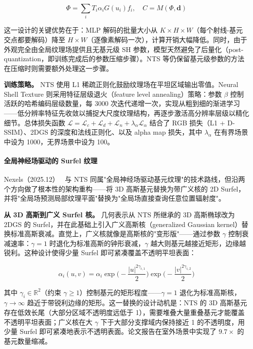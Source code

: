 \begin{equation}
\Phi = \sum_i T_i \alpha_i G(u_i) f_i, \quad C = M(\Phi, \mathbf{d})
\end{equation}

这一设计的关键优势在于：MLP 解码的批量大小从 $K \times H \times W$（每个射线-基元交点都要解码）降至 $H \times W$（逐像素解码一次），计算开销大幅降低。同时，由于外观完全由全局纹理场提供且无基元级 SH 参数，模型天然避免了后量化（post-quantization，即训练完成后的参数压缩步骤）。NTS 等仍保留基元级参数的方法在压缩时则需要额外处理这一步骤。

\smallskip
\noindent\textbf{训练策略。}
NTS 使用 L1 稀疏正则化鼓励纹理场在平坦区域输出零值。Neural Shell Texture 则采用特征层级退火（feature level annealing）策略：参数 $\beta$ 控制活跃的哈希编码层级数量，每 3000 次迭代递增一次，实现从粗到细的渐进学习——低分辨率特征先收敛以捕捉大尺度纹理结构，再逐步激活高分辨率层级以精化细节。总体损失函数 $\mathcal{L} = \mathcal{L}_c + \mathcal{L}_d + \mathcal{L}_n + \lambda_\alpha \mathcal{L}_\alpha$ 结合了 RGB 损失（L1 + D-SSIM）、2DGS 的深度和法线正则化、以及 alpha map 损失，其中 $\lambda_\alpha$ 在有界场景中设为 1000，无界场景中设为 100。

\paragraph{全局神经场驱动的 Surfel 纹理}

Nexels（2025.12）~\cite{2512_13796} 与 NTS 同属"全局神经场驱动基元纹理"的技术路线，但沿两个方向做了根本性的架构重构——将 3D 高斯基元替换为带广义核的 2D Surfel，并将"全局场预测局部纹理平面"替换为"全局场直接查询任意位置辐射度"。

\smallskip
\noindent\textbf{从 3D 高斯到广义 Surfel 核。}
几何表示从 NTS 所继承的 3D 高斯椭球改为 2DGS 的 Surfel，并在此基础上引入广义高斯核（generalized Gaussian kernel）替换标准高斯衰减。直觉上，广义核就像是高斯核的"变形版"——通过参数 $\gamma$ 控制衰减速率：$\gamma=1$ 时退化为标准高斯的钟形衰减，$\gamma$ 越大则基元越接近矩形，边缘越锐利。这种设计使得少量 Surfel 即可紧凑覆盖不透明平坦表面：

\begin{equation}
\alpha_i(u,v) = \alpha_i \exp\!\bigg(-\frac{|u|^{2\gamma_{i,1}}}{2}\bigg)\exp\!\bigg(-\frac{|v|^{2\gamma_{i,2}}}{2}\bigg)
\end{equation}

其中 $\gamma_i \in \mathbb{R}^2$（约束 $\gamma \geq 1$）控制基元的矩形程度——$\gamma = 1$ 退化为标准高斯核，$\gamma \to \infty$ 趋近于带锐利边缘的矩形。这一替换的设计动机是：NTS 的 3D 高斯基元存在低效长尾（大部分区域不透明度远低于 1），需要堆叠大量重叠基元才能覆盖不透明平坦表面；广义核在大 $\gamma$ 下于大部分支撑域内保持接近 1 的不透明度，用少量 Surfel 即可紧凑地表示不透明表面。论文报告在室外场景中实现了 $9.7\times$ 的基元数量缩减。

